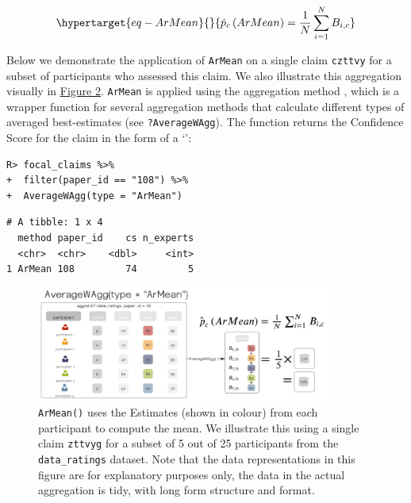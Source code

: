 \documentclass[article]{jss}
\newcommand{\class}[1]{`\code{#1}'}
\newcommand{\fct}[1]{\code{#1()}}
\begin{document}
\begin{equation}\protect\hypertarget{eq-ArMean}{}{
\hat{p}_c\left(ArMean \right ) = \frac{1}{N}\sum_{i=1}^N B_{i,c}
}\label{eq-ArMean}\end{equation}

Below we demonstrate the application of \texttt{ArMean} on a single
claim \texttt{czttvy} for a subset of participants who assessed this
claim. We also illustrate this aggregation visually in
\protect\hyperlink{fig-ArMean}{Figure 2}. \texttt{ArMean} is applied
using the aggregation method \fct{AverageWAgg}, which is a wrapper
function for several aggregation methods that calculate different types
of averaged best-estimates (see \texttt{?AverageWAgg}). The function
returns the Confidence Score for the claim in the form of a
\class{tibble}:

\begin{verbatim}
R> focal_claims %>% 
+  filter(paper_id == "108") %>%
+  AverageWAgg(type = "ArMean")
\end{verbatim}

\begin{verbatim}
# A tibble: 1 x 4
  method paper_id    cs n_experts
  <chr>  <chr>    <dbl>     <int>
1 ArMean 108         74         5
\end{verbatim}

\begin{figure}

{\centering \includegraphics[width=3.83in,height=\textheight]{images/paste-80B1C5CB.png}

}

\caption{\label{fig-ArMean}\texttt{ArMean()} uses the Estimates (shown
in colour) from each participant to compute the mean. We illustrate this
using a single claim \texttt{zttvyg} for a subset of 5 out of 25
participants from the \texttt{data\_ratings} dataset. Note that the data
representations in this figure are for explanatory purposes only, the
data in the actual aggregation is tidy, with long form structure and
format.}

\end{figure}
\end{document}
